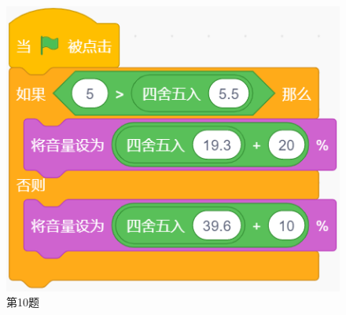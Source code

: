 \documentclass[10pt, a4paper]{article}
\begin{document}
\begin{enumerate}
        \begin{figure}[htbp]
            \centering
            \begin{minipage}[t]{.18\textwidth}
                \centering
                \includegraphics[width=\textwidth]{10.png}
                \caption*{第10题}
            \end{minipage}
            \begin{minipage}[t]{.16\textwidth}
                \centering

\end{minipage}
\end{figure}
\end{enumerate}
\end{document}
